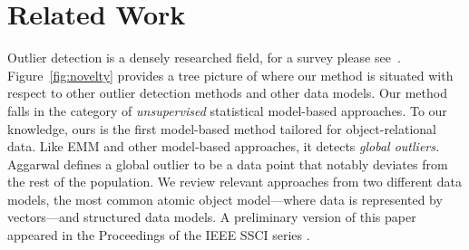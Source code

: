 {				\section{Related Work}
				Outlier detection is a densely researched field, for a survey please see~\citep{aggarwal2013,Akoglu2015}.
				Figure~\ref{fig:novelty} provides a tree picture of where our method is situated with respect to other outlier detection methods and other data models. 
				Our method falls in the category of {\em unsupervised} statistical model-based approaches. To our knowledge, ours is the first model-based method tailored for object-relational data. Like EMM and other model-based approaches, it detects {\em global outliers.} Aggarwal \citep{aggarwal2013} defines a global outlier to be a data point that notably deviates from the rest of the population. We review relevant approaches from two different data models, the most common atomic object model---where data is represented by vectors---and structured data models. A preliminary version of this paper appeared in the Proceedings of the IEEE SSCI series \citep{Riahi2015}. \\
				
}
